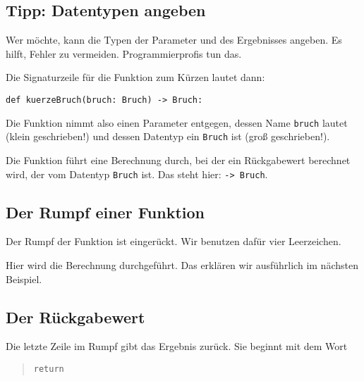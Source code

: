 \subsection*{Tipp: Datentypen angeben}

Wer möchte, kann die Typen der Parameter und des Ergebnisses angeben. Es hilft, Fehler zu vermeiden. Programmierprofis tun das.

Die Signaturzeile für die Funktion zum Kürzen lautet dann:

\lstset{style=syntaxPython}
\begin{lstlisting}
def kuerzeBruch(bruch: Bruch) -> Bruch:
\end{lstlisting}

Die Funktion nimmt also einen Parameter entgegen, dessen Name \texttt{bruch} lautet (klein geschrieben!) und dessen Datentyp ein \texttt{Bruch} ist (groß geschrieben!).

Die Funktion führt eine Berechnung durch, bei der ein Rückgabewert berechnet wird, der vom Datentyp \texttt{Bruch} ist. Das steht hier: \texttt{-> Bruch}.

\subsection*{Der Rumpf einer Funktion}

Der Rumpf der Funktion ist eingerückt. Wir benutzen dafür vier Leerzeichen.

Hier wird die Berechnung durchgeführt. Das erklären wir ausführlich im nächsten Beispiel.


\subsection*{Der Rückgabewert}

Die letzte Zeile im Rumpf gibt das Ergebnis zurück. Sie beginnt mit dem Wort
\begin{quote}
\texttt{return}
\end{quote}

